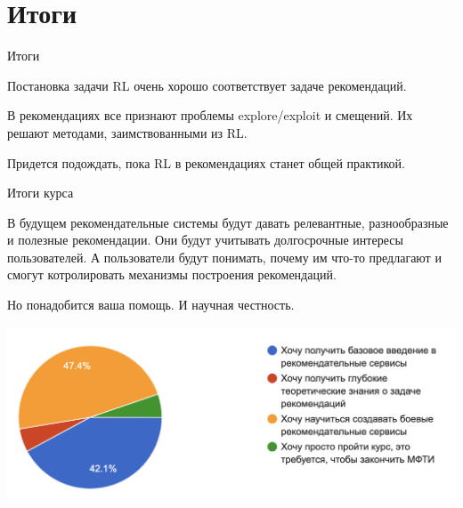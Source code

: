 \documentclass[11pt,aspectratio=169,handout]{beamer}
\begin{document}
\section{Итоги}

\begin{frame}{Итоги}

\begin{tcolorbox}[colback=info!5,colframe=info!80,title=]
Постановка задачи RL очень хорошо соответствует задаче рекомендаций.
\end{tcolorbox}

\vfill

\begin{tcolorbox}[colback=info!5,colframe=info!80,title=]
В рекомендациях все признают проблемы explore/exploit и смещений. Их решают методами, заимствованными из RL.
\end{tcolorbox}

\vfill

\begin{tcolorbox}[colback=warn!5,colframe=warn!80,title=]
Придется подождать, пока RL в рекомендациях станет общей практикой.
\end{tcolorbox}

\end{frame}

\begin{frame}{Итоги курса}

\begin{tcolorbox}[colback=info!5,colframe=info!80,title=]
В будущем рекомендательные системы будут давать релевантные, разнообразные и полезные рекомендации. Они будут учитывать долгосрочные интересы пользователей. А пользователи будут понимать, почему им что-то предлагают и смогут котролировать механизмы построения рекомендаций.
\end{tcolorbox}

\begin{tcolorbox}[colback=info!5,colframe=info!80,title=]
Но понадобится ваша помощь. И научная честность.
\end{tcolorbox}

\end{frame}

\begin{frame}

\begin{center}
\includegraphics[scale=0.5]{images/poll.png}
\end{center}

\end{frame}
\end{document}
